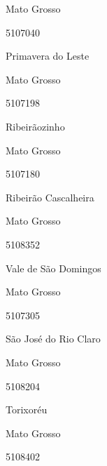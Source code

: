 \documentclass[
  letterpaper,
]{report}
\begin{document}
\n      

Mato Grosso

\n      

5107040

\n      

Primavera do Leste

\n    

\n    

\n      

Mato Grosso

\n      

5107198

\n      

Ribeirãozinho

\n    

\n    

\n      

Mato Grosso

\n      

5107180

\n      

Ribeirão Cascalheira

\n    

\n    

\n      

Mato Grosso

\n      

5108352

\n      

Vale de São Domingos

\n    

\n    

\n      

Mato Grosso

\n      

5107305

\n      

São José do Rio Claro

\n    

\n    

\n      

Mato Grosso

\n      

5108204

\n      

Torixoréu

\n    

\n    

\n      

Mato Grosso

\n      

5108402
\end{document}
